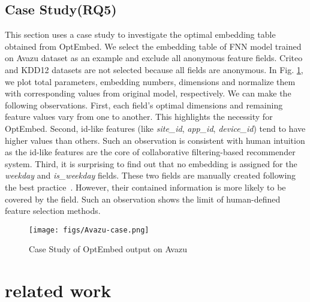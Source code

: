 \documentclass[sigconf]{acmart}
\begin{document}
\subsection{Case Study(RQ5)}
This section uses a case study to investigate the optimal embedding table obtained from OptEmbed. We select the embedding table of FNN model trained on Avazu dataset as an example and exclude all anonymous feature fields. Criteo and KDD12 datasets are not selected because all fields are anonymous. In Fig. \ref{fig:case}, we plot total parameters, embedding numbers, dimensions and normalize them with corresponding values from original model, respectively. We can make the following observations. First, each field's optimal dimensions and remaining feature values vary from one to another. This highlights the necessity for OptEmbed. Second, id-like features (like \textit{site\_id}, \textit{app\_id}, \textit{device\_id}) tend to have higher values than others. Such an observation is consistent with human intuition as the id-like features are the core of collaborative filtering-based recommender system. Third, it is surprising to find out that no embedding is assigned for the \textit{weekday} and \textit{is\_weekday} fields. These two fields are manually created following the best practice~\cite{fuxictr}. However, their contained information is more likely to be covered by the  field. Such an observation shows the limit of human-defined feature selection methods.

\begin{figure}[!htbp]
    \centering
    \texttt{[image: figs/Avazu-case.png]}
    \vspace{-10pt}
    \caption{Case Study of OptEmbed output on Avazu}
    \label{fig:case}
    \vspace{-10pt}
\end{figure}















 \section{related work}
\label{sec:rw}
\end{document}
